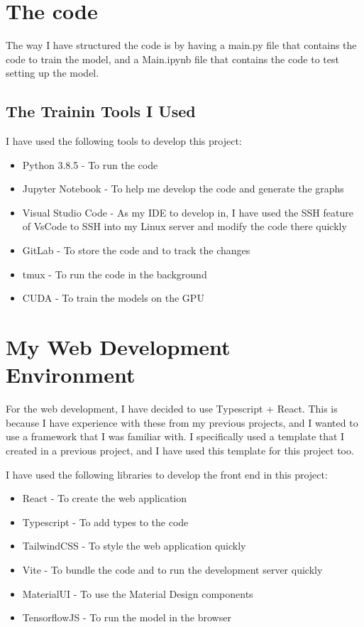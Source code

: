 \documentclass[]{final_report}
\begin{document}
\section{The code}
The way I have structured the code is by having a main.py file that contains the code to train the model, and a Main.ipynb file that contains the code to test setting up the model.

\subsection{The Trainin Tools I Used}

I have used the following tools to develop this project:
\begin{itemize}
  \item Python 3.8.5\cite{Python} - To run the code
  \item Jupyter Notebook\cite{Jupyter} - To help me develop the code and generate the graphs
  \item Visual Studio Code\cite{VsCode} - As my IDE to develop in, I have used the SSH feature of VsCode to SSH into my Linux server and modify the code there quickly
  \item GitLab\cite{RHULGitLab} - To store the code and to track the changes
  \item tmux\cite{tmux} - To run the code in the background
  \item CUDA\cite{CUDA} - To train the models on the GPU
\end{itemize}

\section{My Web Development Environment}

For the web development, I have decided to use Typescript + React. This is because I have experience with these from my previous projects, and I wanted to use a framework that I was familiar with. I specifically used a template\cite{TypescriptProjectTemplate} that I created in a previous project, and I have used this template for this project too.

I have used the following libraries to develop the front end in this project:
\begin{itemize}
  \item React\cite{React} - To create the web application
  \item Typescript\cite{Typescript} - To add types to the code
  \item TailwindCSS\cite{tailwindcss} - To style the web application quickly
  \item Vite\cite{Vite} - To bundle the code and to run the development server quickly
  \item MaterialUI\cite{MaterialUI} - To use the Material Design components
  \item TensorflowJS\cite{smilkov2019tensorflowjs} - To run the model in the browser
\end{itemize}
\end{document}
